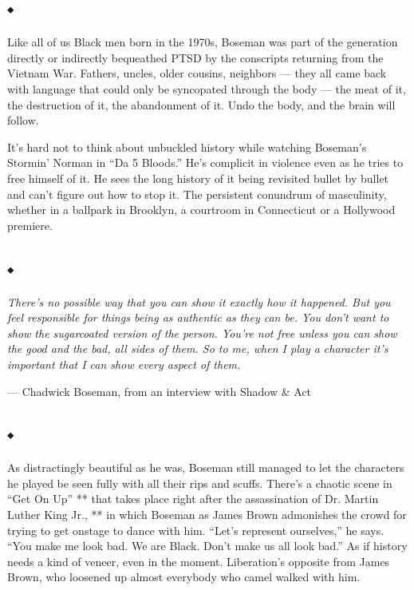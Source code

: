 \hypertarget{-4}{%
\subsection{⬩}\label{-4}}

Like all of us Black men born in the 1970s, Boseman was part of the
generation directly or indirectly bequeathed PTSD by the conscripts
returning from the Vietnam War. Fathers, uncles, older cousins,
neighbors --- they all came back with language that could only be
syncopated through the body --- the meat of it, the destruction of it,
the abandonment of it. Undo the body, and the brain will follow.

It's hard not to think about unbuckled history while watching Boseman's
Stormin' Norman in ``Da 5 Bloods.'' He's complicit in violence even as
he tries to free himself of it. He sees the long history of it being
revisited bullet by bullet and can't figure out how to stop it. The
persistent conundrum of masculinity, whether in a ballpark in Brooklyn,
a courtroom in Connecticut or a Hollywood premiere.

\hypertarget{-5}{%
\subsection{⬩}\label{-5}}

\emph{There's no possible way that you can show it exactly how it
happened. But you feel responsible for things being as authentic as they
can be. You don't want to show the sugarcoated version of the person.
You're not free unless you can show the good and the bad, all sides of
them. So to me, when I play a character it's important that I can show
every aspect of them.}

--- Chadwick Boseman, from an interview with Shadow \& Act

\hypertarget{-6}{%
\subsection{⬩}\label{-6}}

As distractingly beautiful as he was, Boseman still managed to let the
characters he played be seen fully with all their rips and scuffs.
There's a chaotic scene in ``Get On Up'' ** that takes place right after
the assassination of Dr. Martin Luther King Jr., ** in which Boseman as
James Brown admonishes the crowd for trying to get onstage to dance with
him. ``Let's represent ourselves,'' he says. ``You make me look bad. We
are Black. Don't make us all look bad.'' As if history needs a kind of
veneer, even in the moment. Liberation's opposite from James Brown, who
loosened up almost everybody who camel walked with him.


